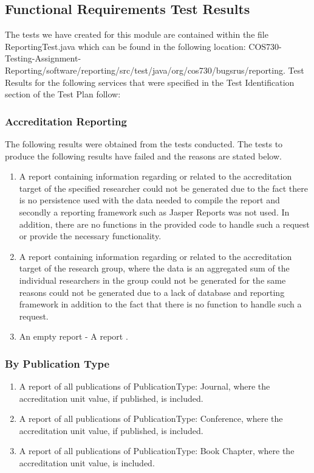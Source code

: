 \subsection{Functional Requirements Test Results}
The tests we have created for this module are contained within the file ReportingTest.java which can be found in the following location: COS730-Testing-Assignment-Reporting/software/reporting/src/test/java/org/cos730/bugsrus/reporting.
Test Results for the following services that were specified in the Test Identification section of the Test Plan follow:  
\subsubsection{Accreditation Reporting}  
The following results were obtained from the tests conducted. The tests to produce the following results have failed and the reasons are stated below. 
\begin{enumerate}
	\item A report containing information regarding or related to the accreditation target of the specified researcher could not be generated due to the fact there is no persistence used with the data needed to compile the report and secondly a reporting framework such as Jasper Reports was not used. In addition, there are no functions in the provided code to handle such a request or provide the necessary functionality. 
	\item A report containing information regarding or related to the accreditation target of the research group, where the data is an aggregated sum of the individual researchers in the group could not be generated for the same reasons could not be generated due to a lack of database and reporting framework in addition to the fact that there is no function to handle such a request.
	\item An empty report - A report . 
\end{enumerate}

\subsubsection{By Publication Type}
\begin{enumerate}
	\item A report of all publications of PublicationType: Journal, where the accreditation unit value, if published, is included.
	\item A report of all publications of PublicationType: Conference, where the accreditation unit value, if published, is included.
	\item A report of all publications of PublicationType: Book Chapter, where the accreditation unit value, is included.
\end{enumerate}


